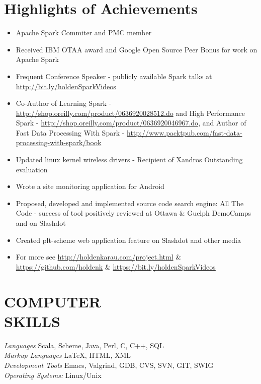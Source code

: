 \documentclass[10pt,line,margin=0.1]{newsres}
\begin{document}
\address{San Francisco, CA, USA}
\address{E-mail: holden@pigscanfly.ca, Cell: (425) 233-8271}
 
\begin{resume}
  \section{Highlights of Achievements}
  \begin{itemize}  \itemsep -2pt %
  \item{Apache Spark Commiter and PMC member}
  \item{Received IBM OTAA award and Google Open Source Peer Bonus for work on Apache Spark}
  \item{Frequent Conference Speaker - publicly available Spark talks at \url{http://bit.ly/holdenSparkVideos}}
  \item{Co-Author of Learning Spark - \url{http://shop.oreilly.com/product/0636920028512.do} and  High Performance Spark - \url{http://shop.oreilly.com/product/0636920046967.do}, and Author of Fast Data Processing With Spark - \url{http://www.packtpub.com/fast-data-processing-with-spark/book}}
  \item{Updated linux kernel wireless drivers - Recipient of Xandros Outstanding evaluation}
  \item{Wrote a site monitoring application for Android}
  \item{Proposed, developed and implemented source code search engine: All The Code - success of tool positively reviewed at Ottawa \& Guelph DemoCamps and on Slashdot}
  \item{Created plt-scheme web application feature on Slashdot and other media}
  \item{For more see \url{http://holdenkarau.com/project.html} \& \url{https://github.com/holdenk} \& \url{https://bit.ly/holdenSparkVideos}}
\end{itemize}
\section{COMPUTER \\ SKILLS} {\sl Languages} Scala, Scheme, Java, Perl, C, C++, SQL \\
                {\sl Markup Languages} \LaTeX , HTML, XML \\
                {\sl Development Tools} Emacs, Valgrind, GDB, CVS, SVN, GIT, SWIG \\
                {\sl Operating Systems:}  Linux/Unix \\
 

\end{resume}
\end{document}

